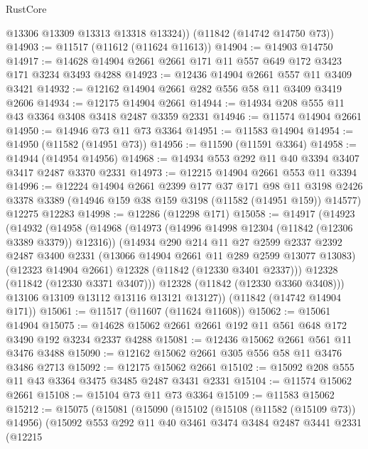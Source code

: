\begin{lexlean}{RustCore}
\begin{coremodule}
        @13306
        @13309
        @13313
        @13318
        @13324))
    (@11842 (@14742 @14750 @73))
@14903 := @11517 (@11612 (@11624 @11613))
@14904 := @14903 @14750
@14917 := @14628 @14904 @2661 @2661 @171 @11 @557 @649 @172 @3423 @171 @3234 @3493 @4288
@14923 := @12436 @14904 @2661 @557 @11 @3409 @3421
@14932 := @12162 @14904 @2661 @282 @556 @58 @11 @3409 @3419 @2606
@14934 := @12175 @14904 @2661
@14944 := @14934 @208 @555 @11 @43 @3364 @3408 @3418 @2487 @3359 @2331
@14946 := @11574 @14904 @2661
@14950 := @14946 @73 @11 @73 @3364
@14951 := @11583 @14904
@14954 := @14950 (@11582 (@14951 @73))
@14956 := @11590 (@11591 @3364)
@14958 := @14944 (@14954 @14956)
@14968 := @14934 @553 @292 @11 @40 @3394 @3407 @3417 @2487 @3370 @2331
@14973 := @12215 @14904 @2661 @553 @11 @3394
@14996 := @12224
    @14904
    @2661
    @2399
    @177
    @37
    @171
    @98
    @11
    @3198
    @2426
    @3378
    @3389
    (@14946 @159 @38 @159 @3198 (@11582 (@14951 @159)) @14577)
    @12275
    @12283
@14998 := @12286 (@12298 @171)
@15058 := @14917
    (@14923
      (@14932
        (@14958
          (@14968
            (@14973 (@14996 @14998 @12304 (@11842 (@12306 @3389 @3379)) @12316))
            (@14934
              @290
              @214
              @11
              @27
              @2599
              @2337
              @2392
              @2487
              @3400
              @2331
              (@13066 @14904 @2661 @11 @289 @2599 @13077 @13083)
              (@12323 @14904 @2661)
              @12328
              (@11842 (@12330 @3401 @2337)))
            @12328
            (@11842 (@12330 @3371 @3407)))
          @12328
          (@11842 (@12330 @3360 @3408)))
        @13106
        @13109
        @13112
        @13116
        @13121
        @13127))
    (@11842 (@14742 @14904 @171))
@15061 := @11517 (@11607 (@11624 @11608))
@15062 := @15061 @14904
@15075 := @14628 @15062 @2661 @2661 @192 @11 @561 @648 @172 @3490 @192 @3234 @2337 @4288
@15081 := @12436 @15062 @2661 @561 @11 @3476 @3488
@15090 := @12162 @15062 @2661 @305 @556 @58 @11 @3476 @3486 @2713
@15092 := @12175 @15062 @2661
@15102 := @15092 @208 @555 @11 @43 @3364 @3475 @3485 @2487 @3431 @2331
@15104 := @11574 @15062 @2661
@15108 := @15104 @73 @11 @73 @3364
@15109 := @11583 @15062
@15212 := @15075
    (@15081
      (@15090
        (@15102
          (@15108 (@11582 (@15109 @73)) @14956)
          (@15092
            @553
            @292
            @11
            @40
            @3461
            @3474
            @3484
            @2487
            @3441
            @2331
            (@12215

\end{coremodule}
\end{lexlean}

